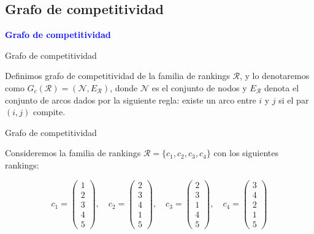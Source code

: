 \documentclass[10pt]{beamer}
\begin{document}
	\subsection{Grafo de competitividad}
	
	\begin{frame}
		\begin{center}
			\Huge\textbf{\textsf{\textcolor{blue}{Grafo de competitividad}}}
		\end{center}
	\end{frame}
	
	\begin{frame}{Grafo de competitividad}
		\begin{defi}
			Definimos grafo de competitividad de la familia de rankings $\mathcal{R}$, y lo denotaremos como $G_c(\mathcal{R}) = (\mathcal{N}, E_\mathcal{R})$, donde $\mathcal{N}$ es el conjunto de nodos y $E_\mathcal{R}$ denota el conjunto de arcos dados por la siguiente regla: existe un arco entre $i$ y $j$ si el par $(i,j)$ compite.
		\end{defi}
	\end{frame}
	
	\begin{frame}{Grafo de competitividad}
		\begin{ejemplo}
			Consideremos la familia de rankings $\mathcal{R} = \{c_1, c_2, c_3, c_4\}$ con los siguientes rankings:
			
			\begin{equation*}
			c_1 = \left( \begin{array}{c}
			1 \\
			2 \\
			3 \\
			4 \\
			5
			\end{array} \right), \quad
			c_2 = \left( \begin{array}{c}
			2 \\
			3 \\
			4 \\
			1 \\
			5
			\end{array} \right), \quad
			c_3 = \left( \begin{array}{c}
			2 \\
			3 \\
			1 \\
			4 \\
			5
			\end{array} \right), \quad
			c_4 = \left( \begin{array}{c}
			3 \\
			4 \\
			2 \\
			1 \\
			5
			\end{array} \right)
			\end{equation*}
		
		\end{ejemplo}
	\end{frame}
	
\end{document}
